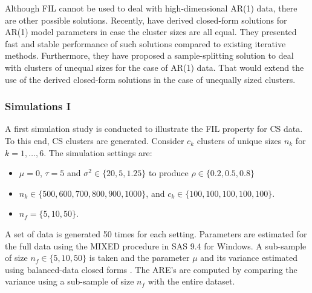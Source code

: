 \documentclass[11pt,a5paper,twoside]{book}
\begin{document}
Although FIL cannot be used to deal with high-dimensional AR(1) data, there are other possible solutions. Recently, \cite{Lisa2016_3} have derived closed-form solutions for AR(1) model parameters in case the cluster sizes are all equal. They presented fast and stable performance of such solutions compared to existing iterative methods. Furthermore, they have proposed a sample-splitting solution to deal with clusters of unequal sizes for the case of AR(1) data. That would extend the use of the derived closed-form solutions in the case of unequally sized clusters.


\subsubsection{Simulations I}
\label{sub_sec_sim1}
A first simulation study is conducted to illustrate the FIL property for CS data. To this end, CS clusters are generated.  Consider $c_k$ clusters of unique sizes $n_k$ for $k=1,\ldots,6$. The simulation settings are:
\begin{itemize}
\item $\mu=0$, $\tau=5$ and $\sigma^2\in\{20,5,1.25\}$ to produce $\rho\in\{0.2,0.5,0.8\}$
\item $n_k\in\{500,600,700,800,900,1000\}$, and $c_k\in\{100,100,100,100,100\}$.
\item $n_f=\{5,10,50\}$. 
\end{itemize}
A set of data is generated 50 times for each setting. Parameters are estimated for the full data using the MIXED procedure in SAS 9.4 for Windows. A sub-sample of size $n_f\in\{5,10,50\}$ is taken and the parameter $\mu$ and its variance  estimated using  balanced-data closed forms \cite{Iddi2011}. The ARE's are computed by comparing the variance using a sub-sample of size $n_f$ with the entire dataset. 
\end{document}
